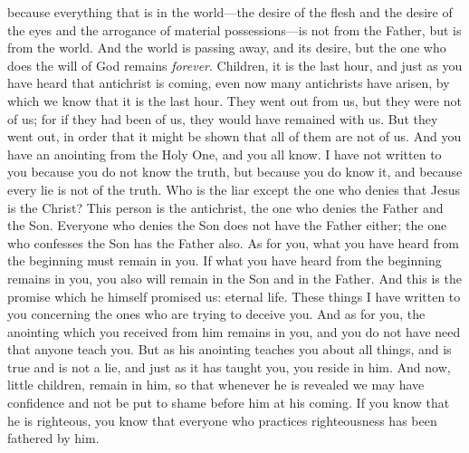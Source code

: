\begin{biblechapter}
\verse because everything that is in the world—the desire of the flesh and the desire of the eyes and the arrogance of material possessions—is not from the Father, but is from the world.
\verse And the world is passing away, and its desire, but the one who does the will of God remains \textit{forever}.
 Children, it is the last hour, and just as you have heard that antichrist is coming, even now many antichrists have arisen, by which we know that it is the last hour.
\verse They went out from us, but they were not of us; for if they had been of us, they would have remained with us. But they went out, in order that it might be shown that all of them are not of us.
\verse And you have an anointing from the Holy One, and you all know.
\verse I have not written to you because you do not know the truth, but because you do know it, and because every lie is not of the truth.
\verse Who is the liar except the one who denies that Jesus is the Christ? This person is the antichrist, the one who denies the Father and the Son.
\verse Everyone who denies the Son does not have the Father either; the one who confesses the Son has the Father also.
\verse As for you, what you have heard from the beginning must remain in you. If what you have heard from the beginning remains in you, you also will remain in the Son and in the Father.
\verse And this is the promise which he himself promised us: eternal life.
\verse These things I have written to you concerning the ones who are trying to deceive you.
\verse And as for you, the anointing which you received from him remains in you, and you do not have need that anyone teach you. But as his anointing teaches you about all things, and is true and is not a lie, and just as it has taught you, you reside in him.
 And now, little children, remain in him, so that whenever he is revealed we may have confidence and not be put to shame before him at his coming.
\verse If you know that he is righteous, you know that everyone who practices righteousness has been fathered by him.
\end{biblechapter}

